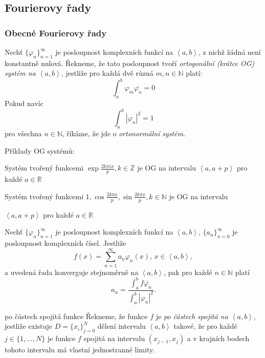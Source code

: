 \subsection{Fourierovy řady}

\subsubsection{Obecné Fourierovy řady}

\begin{definice}
Nechť $\{\varphi_n\}_{n=1}^{\infty}$ je posloupnost komplexních funkcí na $\left<a,b\right>$, z nichž žádná není konstantně nulová. Řekneme, že tato posloupnost tvoří \emph{ortogonální (krátce OG) systém na $\left<a,b\right>$}, jestliže pro každá dvě různá $m, n\in \mathbb{N}$ platí:
$$\int_a^b \varphi_m \overline{\varphi_n} = 0$$
Pokud navíc
$$\int_a^b |\varphi_n|^2= 1$$
pro všechna $n \in \mathbb{N}$, říkáme, že jde o \emph{ortonormální systém}.
\end{definice}

\begin{poznamka}
Příklady OG systémů:
\begin{pitemize}
	\item Systém tvořený funkcemi $\exp \frac{2k\pi i x}{p}, k \in \mathbb{Z}$ je OG na intervalu $\left<a, a+p\right>$ pro každé $a \in \mathbb{R}$
	\item Systém tvořený funkcemi $1, \cos \frac{2k\pi x}{p}, \sin \frac{2k\pi x}{p}, k \in \mathbb{N}$ je OG na intervalu \par$\left<a, a+p\right>$ pro každé $a \in \mathbb{R}$
\end{pitemize}
\end{poznamka}

\begin{veta}
Nechť $\{\varphi_n\}_{n=1}^{\infty}$ je posloupnost komplexních funkcí na $\left<a,b\right>$, $\{a_n\}_{n=0}^{\infty}$ je posloupnost komplexních čísel. Jestliže
$$f(x) = \sum_{n=1}^{\infty} a_n \varphi_n(x), \, x \in \left<a,b\right>,$$
a uvedená řada konverguje stejnoměrně na $\left<a,b\right>$, pak pro každé $n \in \mathbb{N}$ platí
$$a_n = \frac{\int_a^b f\overline{\varphi_n}}{\int_a^b |\varphi_n|^2}.$$
\end{veta}

\begin{definiceN}{po částech spojitá funkce}
Řekneme, že funkce $f$ je \emph{po částech spojitá na $\left<a,b\right>$}, jestliže existuje $D=\{x_i\}_{j=0}^{N}$ dělení intervalu $\left<a,b\right>$ takové, že pro každé $j \in \{1,\dots,N\}$ je funkce $f$ spojitá na intervalu $(x_{j-1}, x_j)$ a v krajních bodech tohoto intervalu má vlastní jednostranné limity.
\end{definiceN}

